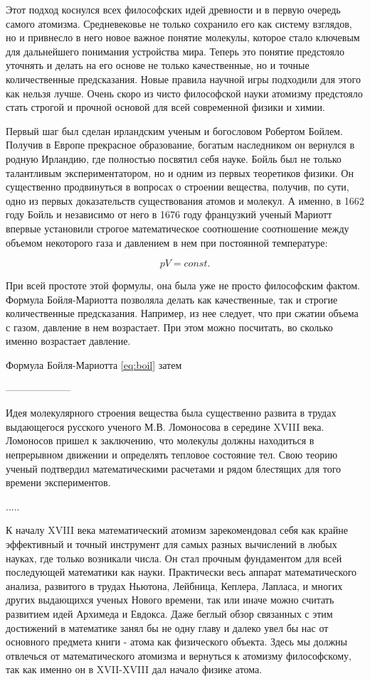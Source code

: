 Этот подход коснулся всех философских идей древности и в первую очередь самого атомизма.
Средневековье не только сохранило его как систему взглядов, но и привнесло в него новое важное понятие молекулы, которое стало ключевым для дальнейшего понимания устройства мира. 
Теперь это понятие предстояло уточнять и делать на его основе не только качественные, но и точные количественные предсказания.
Новые правила научной игры подходили для этого как нельзя лучше.
Очень скоро из чисто философской науки атомизму предстояло стать строгой и прочной основой для всей современной физики и химии.

Первый шаг был сделан ирландским ученым и богословом Робертом Бойлем.
Получив в Европе прекрасное образование, богатым наследником он вернулся в родную Ирландию, где полностью посвятил себя науке.
Бойль был не только талантливым экспериментатором, но и одним из первых теоретиков физики.
Он существенно продвинуться в вопросах о строении вещества, получив, по сути, одно из первых доказательств существования атомов и молекул.
А именно, в 1662 году Бойль и независимо от него в 1676 году французкий ученый Мариотт впервые установили строгое математическое соотношение соотношение между объемом некоторого газа и давлением в нем при постоянной температуре:

\begin{equation}\label{eq:boil}
pV = const.
\end{equation}

При всей простоте этой формулы, она была уже не просто философским фактом.
Формула Бойля-Мариотта позволяла делать как качественные, так и строгие количественные предсказания.
Например, из нее следует, что при сжатии объема с газом, давление в нем возрастает.
При этом можно посчитать, во сколько именно возрастает давление.

Формула Бойля-Мариотта \ref{eq:boil} затем 


--------------------

Идея молекулярного строения вещества была существенно развита в трудах выдающегося русского ученого М.В. Ломоносова в середине XVIII века.
Ломоносов пришел к заключению, что молекулы должны находиться в непрерывном движении и определять тепловое состояние тел.
Свою теорию ученый подтвердил математическими расчетами и рядом блестящих для того времени экспериментов.

.....




К началу XVIII века математический атомизм зарекомендовал себя как крайне эффективный и точный инструмент для самых разных вычислений в любых науках, где только возникали числа. 
Он стал прочным фундаментом для всей последующей математики как науки.
Практически весь аппарат математического анализа, развитого в трудах Ньютона, Лейбница, Кеплера, Лапласа, и многих других выдающихся ученых Нового времени, так или иначе можно считать развитием идей Архимеда и Евдокса.
Даже беглый обзор связанных с этим достижений в математике занял бы не одну главу и далеко увел бы нас от основного предмета книги - атома как физического объекта.
Здесь мы должны отвлечься от математического атомизма и вернуться к атомизму философскому, так как именно он в XVII-XVIII дал начало физике атома.


